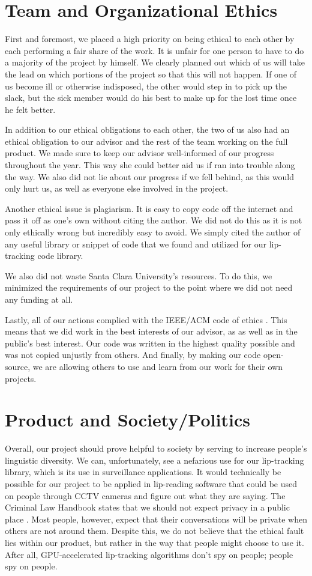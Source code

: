 \section{Team and Organizational Ethics}
First and foremost, we placed a high priority on being ethical to each other by each performing a fair share of the work. It is unfair for one person to have to do a majority of the project by himself. We clearly planned out which of us will take the lead on which portions of the project so that this will not happen. If one of us become ill or otherwise indisposed, the other would step in to pick up the slack, but the sick member would do his best to make up for the lost time once he felt better.

In addition to our ethical obligations to each other, the two of us also had an ethical obligation to our advisor and the rest of the team working on the full product. We made sure to keep our advisor well-informed of our progress throughout the year. This way she could better aid us if ran into trouble along the way. We also did not lie about our progress if we fell behind, as this would only hurt us, as well as everyone else involved in the project.

Another ethical issue is plagiarism. It is easy to copy code off the internet and pass it off as one's own without citing the author. We did not do this as it is not only ethically wrong but incredibly easy to avoid. We simply cited the author of any useful library or snippet of code that we found and utilized for our lip-tracking code library.

We also did not waste Santa Clara University's resources. To do this, we minimized the requirements of our project to the point where we did not need any funding at all. 

Lastly, all of our actions complied with the IEEE/ACM code of ethics \cite{acm-ethics}. This means that we did work in the best interests of our advisor, as as well as in the public's best interest. Our code was written in the highest quality possible and was not copied unjustly from others. And finally, by making our code open-source, we are allowing others to use and learn from our work for their own projects. 


\section{Product and Society/Politics}
Overall, our project should prove helpful to society by serving to increase people's linguistic diversity. We can, unfortunately, see a nefarious use for our lip-tracking library, which is its use in surveillance applications. It would technically be possible for our project to be applied in lip-reading software that could be used on people through CCTV cameras and figure out what they are saying. The Criminal Law Handbook states that we should not expect privacy in a public place \cite{criminal-law}. Most people, however, expect that their conversations will be private when others are not around them. Despite this, we do not believe that the ethical fault lies within our product, but rather in the way that people might choose to use it. After all, GPU-accelerated lip-tracking algorithms don't spy on people; people spy on people. 

